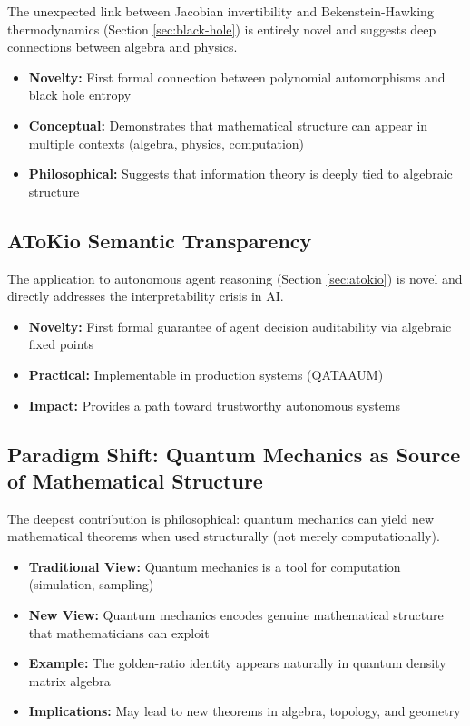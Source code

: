 \documentclass[11pt,a4paper]{article}
\theoremstyle{plain}
\theoremstyle{definition}
\begin{document}
The unexpected link between Jacobian invertibility and Bekenstein-Hawking thermodynamics (Section \ref{sec:black-hole}) is entirely novel and suggests deep connections between algebra and physics.

\begin{itemize}
\item \textbf{Novelty:} First formal connection between polynomial automorphisms and black hole entropy
\item \textbf{Conceptual:} Demonstrates that mathematical structure can appear in multiple contexts (algebra, physics, computation)
\item \textbf{Philosophical:} Suggests that information theory is deeply tied to algebraic structure
\end{itemize}

\subsection{AToKio Semantic Transparency}

The application to autonomous agent reasoning (Section \ref{sec:atokio}) is novel and directly addresses the interpretability crisis in AI.

\begin{itemize}
\item \textbf{Novelty:} First formal guarantee of agent decision auditability via algebraic fixed points
\item \textbf{Practical:} Implementable in production systems (QATAAUM)
\item \textbf{Impact:} Provides a path toward trustworthy autonomous systems
\end{itemize}

\subsection{Paradigm Shift: Quantum Mechanics as Source of Mathematical Structure}

The deepest contribution is philosophical: quantum mechanics can yield new mathematical theorems when used structurally (not merely computationally).

\begin{itemize}
\item \textbf{Traditional View:} Quantum mechanics is a tool for computation (simulation, sampling)
\item \textbf{New View:} Quantum mechanics encodes genuine mathematical structure that mathematicians can exploit
\item \textbf{Example:} The golden-ratio identity appears naturally in quantum density matrix algebra
\item \textbf{Implications:} May lead to new theorems in algebra, topology, and geometry
\end{itemize}
\end{document}
